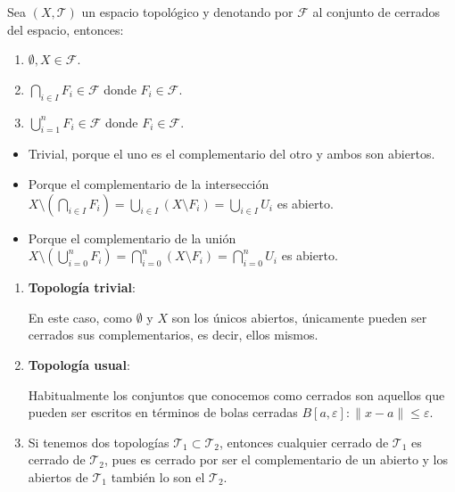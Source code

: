 \begin{prop}
Sea $(X,\mathcal{T})$ un espacio topológico y denotando por $\mathcal{F}$ al conjunto de cerrados del espacio, entonces:
\begin{enumerate}
    \item $\emptyset, X \in \mathcal{F}$.
    \item $\bigcap_{i \in I} F_i \in \mathcal{F}$ donde $F_i \in \mathcal{F}$.
    \item $\bigcup_{i=1}^n F_i \in \mathcal{F}$ donde $F_i \in \mathcal{F}$.
\end{enumerate}
\end{prop}
\begin{demo}
\begin{itemize}
\item Trivial, porque el uno es el complementario del otro y ambos son abiertos.

\item Porque el complementario de la intersección $X\setminus \left(\bigcap_{i \in I} F_i \right) = \bigcup_{i \in I} \left( X \setminus F_i \right) = \bigcup_{i \in I} U_i$ es abierto.

\item Porque el complementario de la unión $X\setminus \left(\bigcup_{i = 0}^n F_i\right) = \bigcap_{i=0}^n \left( X \setminus F_i\right) = \bigcap_{i=0}^n U_i$ es abierto.
\end{itemize}
\end{demo}

\begin{ej}
\begin{enumerate}
    \item \textbf{Topología trivial}:
    
    En este caso, como $\emptyset$ y $X$ son los únicos abiertos, únicamente pueden ser cerrados sus complementarios, es decir, ellos mismos.
    
    \item \textbf{Topología usual}:
    
	Habitualmente los conjuntos que conocemos como cerrados son aquellos que pueden ser escritos en términos de bolas cerradas $B\left[ a, \varepsilon \right] : \lVert x - a \rVert \le \varepsilon$.
	
    \item Si tenemos dos topologías $\mathcal{T}_1 \subset \mathcal{T}_2$, entonces cualquier cerrado de $\mathcal{T}_1$ es cerrado de $\mathcal{T}_2$, pues es cerrado por ser el complementario de un abierto y los abiertos de $\mathcal{T}_1$ también lo son el $\mathcal{T}_2$.
\end{enumerate}
\end{ej}


